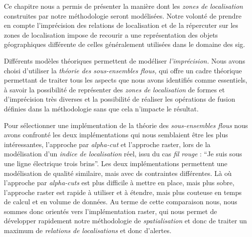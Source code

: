 Ce chapitre nous a permis de présenter la manière dont les \emph{zones de localisation} construites par notre méthodologie seront modélisées. Notre volonté de prendre en compte l'imprécision des relations de localisation et de la répercuter sur les zones de localisation impose de recourir a une représentation des objets géographiques différente de celles généralement utilisées dans le domaine des \ac{sig}.

Différents modèles théoriques permettent de modéliser \emph{l'imprécision.} Nous avons choisi d'utiliser la \emph{théorie des sous-ensembles flous,} qui offre un cadre théorique permettant de traiter tous les aspects que nous avons identifiés comme essentiels, à savoir la possibilité de représenter des \emph{zones de localisation} de formes et d'imprécision très diverses et la possibilité de réaliser les opérations de fusion définies dans la méthodologie sans que cela n'impacte le résultat.

Pour sélectionner une implémentation de la théorie des
\emph{sous-ensembles flous} nous avons confronté les deux
implémentations qui nous semblaient être les plus intéressantes,
l'approche par \emph{alpha-cut} et l'approche raster, lors de la
modélisation d'un \emph{indice de localisation} réel, issu du cas
\emph{fil rouge} : \enquote{Je suis sous une ligne électrique trois brins}. Les deux implémentations permettent une modélisation de qualité similaire, mais avec ds contraintes différentes. Là où l'approche par \emph{alpha-cuts} est plus difficile à mettre en place, mais plus sobre, l'approche raster est rapide à utiliser et à étendre, mais plus couteuse en temps de calcul et en volume de données. Au terme de cette comparaison nous, nous sommes donc orientés vers l'implémentation raster, qui nous permet de développer rapidement notre méthodologie de \emph{spatialisation} et donc de traiter un maximum de \emph{relations de localisations} et donc d'alertes.


